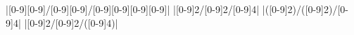 \newcommand{\eqnref}[1]{(\ref{#1})}
\newcommand{\class}[1]{\texttt{#1}}
\newcommand{\package}[1]{\texttt{#1}}
\newcommand{\file}[1]{\texttt{#1}}
\newcommand{\BibTeX}{\textsc{Bib}\TeX}
\newcommand{\tr}[1]{{\ensuremath{\textrm{#1}}}}   %
\newcommand{\tb}[1]{{\ensuremath{\textbf{#1}}}}   %
\newcommand{\ti}[1]{{\ensuremath{\textit{#1}}}}   %
\newcommand{\mc}[1]{{\ensuremath{\mathcal{#1}}}}  %
\newcommand{\mco}[1]{{\ensuremath{\mathcalold{#1}}}}%
\newcommand{\mr}[1]{{\ensuremath{\mathrm{#1}}}}   %
\newcommand{\mb}[1]{{\ensuremath{\mathbf{#1}}}}   %
\newcommand{\bs}[1]{\ensuremath{\boldsymbol{#1}}} %
\def\bm#1{\mathchoice                             %
  {\mbox{\boldmath$\displaystyle#1$}}%
  {\mbox{\boldmath$#1$}}%
  {\mbox{\boldmath$\scriptstyle#1$}}%
  {\mbox{\boldmath$\scriptscriptstyle#1$}}}
\newcommand{\boldcal}[1]{{\ensuremath{\boldsymbol{\mathcal{#1}}}}}%

\newcommand{\mycomment}[1]{\textcolor{blue}{\textbf{[#1]}}}
\newcommand{\true} {\textit{True}}
\newcommand{\false}{\textit{False}}
\newcommand{\regex}[1]{\(\tt #1\)}  %
\newcommand{\regexm}[1]{\texttt{#1}} %
\newcommand{\Forest}{\textsc{Forest}\xspace}
\newcommand{\Regel}{\textsc{Regel}\xspace}
\newcommand{\todo}[1]{\textbf{\color{magenta} [#1]}}

\newcommand{\acknowledgments}{@undefined}



|[0-9][0-9]/[0-9][0-9]/[0-9][0-9][0-9][0-9]|
|[0-9]{2}/[0-9]{2}/[0-9]{4}|
|([0-9]{2})/([0-9]{2})/[0-9]{4}|
|[0-9]{2}/[0-9]{2}/([0-9]{4})|



